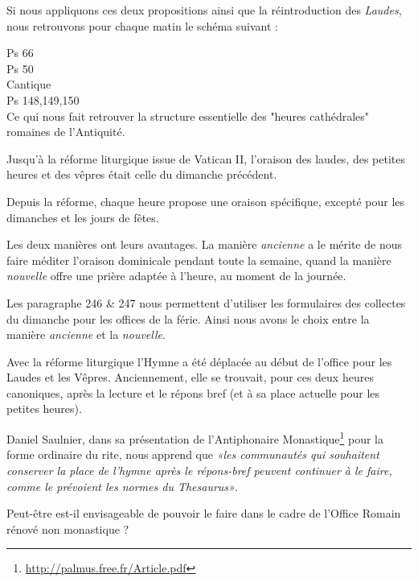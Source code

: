 \documentclass[oneside, 10pt]{article}
\begin{document}
Si nous appliquons ces deux propositions ainsi que la réintroduction des \emph{Laudes}, nous retrouvons pour chaque matin le schéma suivant :

Ps 66\\
Ps 50\\
Cantique\\
Ps 148,149,150\\

Ce qui nous fait retrouver la structure essentielle des "heures cathédrales" romaines de l'Antiquité.


Jusqu'à la réforme liturgique issue de Vatican II, l'oraison des laudes, des petites heures et des vêpres était celle du dimanche précédent.

Depuis la réforme, chaque heure propose une oraison spécifique, excepté pour les dimanches et les jours de fêtes.

Les deux manières ont leurs avantages. La manière \emph{ancienne} a le mérite de nous faire méditer l'oraison dominicale pendant toute la semaine, quand la manière \emph{nouvelle} offre une prière adaptée à l'heure, au moment de la journée.

Les paragraphe 246 \& 247 nous permettent d'utiliser les formulaires des collectes du dimanche pour les offices de la férie. Ainsi nous avons le choix entre la manière \emph{ancienne} et la \emph{nouvelle}.


Avec la réforme liturgique l'Hymne a été déplacée au début de l'office pour les Laudes et les Vêpres. Anciennement, elle se trouvait, pour ces deux heures canoniques, après la lecture et le répons bref (et à sa place actuelle pour les petites heures).

Daniel Saulnier, dans sa présentation de l'Antiphonaire Monastique\footnote{\url{http://palmus.free.fr/Article.pdf}} pour la forme ordinaire du rite, nous apprend que \textit{«les communautés qui souhaitent conserver la place de l’hymne après le répons-bref peuvent continuer à le faire, comme le prévoient les normes du Thesaurus»}.

Peut-être est-il envisageable de pouvoir le faire dans le cadre de l'Office Romain rénové non monastique ?
\end{document}
